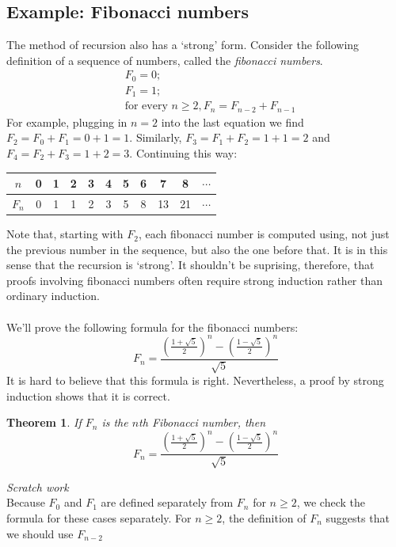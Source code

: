\documentclass{report}
\newtheorem*{theorem}{Theorem}
\theoremstyle{definition}
\begin{document}
\subsection{Example: Fibonacci numbers}
The method of recursion also has a `strong' form. Consider the following definition of a sequence of numbers, called the \textit{fibonacci numbers}.
\begin{align*}
&F_0=0;\\
&F_1=1;\\
&\text{for every }n\geq2,F_n=F_{n-2}+F_{n-1}
\end{align*}
For example, plugging in $n=2$ into the last equation we find $F_2=F_0+F_1=0+1=1$. Similarly, $F_3=F_1+F_2=1+1=2$ and $F_4=F_2+F_3=1+2=3$. Continuing this way:
\begin{center}
\begin{tabular}{c|cccccccccc}
$n$&0&1&2&3&4&5&6&7&8&$\cdots$\\
\hline
$F_n$&0&1&1&2&3&5&8&13&21&$\cdots$
\end{tabular}
\end{center}
Note that, starting with $F_2$, each fibonacci number is computed using, not just the previous number in the sequence, but also the one before that. It is in this sense
that the recursion is `strong'. It shouldn't be suprising, therefore, that proofs involving fibonacci numbers often require strong induction rather than ordinary induction.\\
\vspace{1mm}\\
We'll prove the following formula for the fibonacci numbers:
\begin{equation*}
F_n=\frac{
\left(\frac{1+\sqrt{5}}{2}\right)^n-\left(\frac{1-\sqrt{5}}{2}\right)^n}{\sqrt{5}}
\end{equation*}
It is hard to believe that this formula is right. Nevertheless, a proof by strong induction shows that it is correct.
\begin{theorem}
If $F_n$ is the $n$th Fibonacci number, then
\begin{equation*}
F_n=\frac{
\left(\frac{1+\sqrt{5}}{2}\right)^n-\left(\frac{1-\sqrt{5}}{2}\right)^n}{\sqrt{5}}
\end{equation*}
\end{theorem}
\noindent\textit{Scratch work}\\
Because $F_0$ and $F_1$ are defined separately from $F_n$ for $n\geq2$, we check the formula for these cases separately. For $n\geq2$, the definition of $F_n$ suggests that we should use $F_{n-2}$ 
\end{document}
